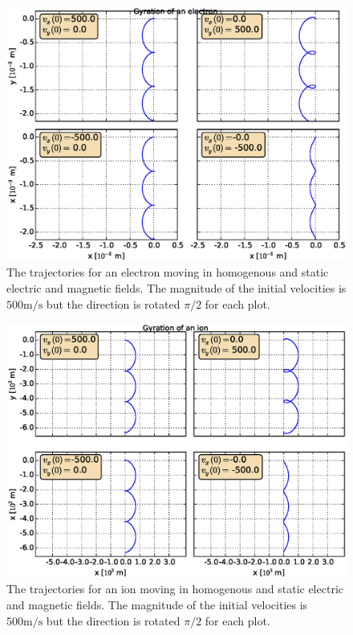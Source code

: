 \documentclass[x11names]{article}
\begin{document}
      \begin{figure}
            \includegraphics[width = \linewidth]{../source/ExBVaryingVelectron}
            \caption{The trajectories for an electron moving in homogenous and static electric and magnetic fields. The magnitude of the initial velocities is \(500 \si{\meter\per\second}\) but the direction is rotated \(\pi/2\) for each plot.}
            \label{fig:VaryVElectron}
      \end{figure}

      \begin{figure}
            \includegraphics[width = \linewidth]{../source/ExBVaryingVion}
            \caption{The trajectories for an ion moving in homogenous and static electric and magnetic fields. The magnitude of the initial velocities is \(500 \si{\meter\per\second}\) but the direction is rotated \(\pi/2\) for each plot.}
            \label{fig:VaryVion}
      \end{figure}
\end{document}
